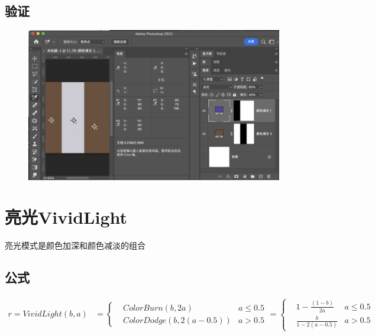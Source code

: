 \subsection{ 验证}

\begin{figure}[h!]
	\centering
	\includegraphics[width=\linewidth]{figure/pinlight}
	\caption{}
	\label{fig:pinlight}
\end{figure}

%
\newpage
\section{ 亮光VividLight}

亮光模式是颜色加深和颜色减淡的组合

\subsection{ 公式}

\begin{equation}
	\begin{aligned}r=VividLight(b,a)&=\left\{ \begin{aligned}&ColorBurn(b,2a)&a\leq 0.5\\&ColorDodge(b,2(a-0.5))&a> 0.5 \end{aligned}\right.=\left\{ \begin{aligned}&1-\frac{(1-b)}{2a}&a\leq 0.5\\&\frac{b}{1-2(a-0.5)}&a>0.5\end{aligned}\right.\end{aligned}
	\end{equation}

